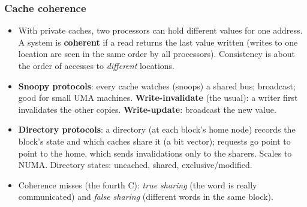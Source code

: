 \subsubsection{Cache coherence}
\begin{itemize}[leftmargin=*]
  \item With private caches, two processors can hold different values for one
  address. A system is \textbf{coherent} if a read returns the last value written
  (writes to one location are seen in the same order by all processors).
  Consistency is about the order of accesses to \emph{different} locations.
  \item \textbf{Snoopy protocols}: every cache watches (snoops) a shared bus;
  broadcast; good for small UMA machines. \textbf{Write-invalidate} (the usual):
  a writer first invalidates the other copies. \textbf{Write-update}: broadcast the new
  value.
  \item \textbf{Directory protocols}: a directory (at each block's home node) records
  the block's state and which caches share it (a bit vector); requests go point to
  point to the home, which sends invalidations only to the sharers. Scales to NUMA.
  Directory states: uncached, shared, exclusive/modified.
  \item Coherence misses (the fourth C): \emph{true sharing} (the word is really
  communicated) and \emph{false sharing} (different words in the same block).
\end{itemize}


